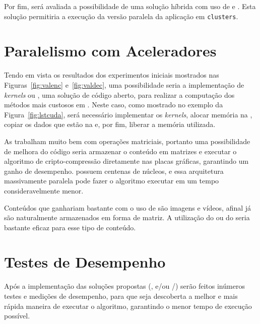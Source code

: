 Por fim, será avaliada a possibilidade de uma solução híbrida com uso de \openMP e \mpi. Esta solução permitiria a execução da versão paralela da aplicação em \texttt{clusters}.

\section{Paralelismo com Aceleradores}

Tendo em  vista os resultados dos experimentos iniciais mostrados nas Figuras~\ref{fig:valenc} e~\ref{fig:valdec}, uma possibilidade seria a implementação de \textit{kernels} \cuda ou \opencl, uma solução de código aberto, para realizar a computação dos métodos mais custosos em \gpu. Neste caso, como mostrado no exemplo da Figura~\ref{fig:lstcuda}, será necessário implementar os \textit{kernels}, alocar memória na \gpu, copiar os dados que estão na \cpu e, por fim, liberar a memória utilizada.

As \gpus trabalham muito bem com operações matriciais, portanto uma possibilidade de melhora do código seria armazenar o conteúdo em matrizes e executar o algoritmo de cripto-compressão diretamente nas placas gráficas, garantindo um ganho de desempenho. \gpus possuem centenas de núcleos, e essa arquitetura massivamente paralela pode fazer o algoritmo \gmpr executar em um tempo consideravelmente menor.

Conteúdos que ganhariam bastante com o uso de \gpus são imagens e vídeos, afinal já são naturalmente armazenados em forma de matriz. A utilização do \cuda ou do \opencl seria bastante eficaz para esse tipo de conteúdo.

\section{Testes de Desempenho}

Após a implementação das soluções propostas (\openMP, \mpi e/ou \cuda/\opencl) serão feitos inúmeros testes e medições de desempenho, para que seja descoberta a melhor e mais rápida maneira de executar o algoritmo, garantindo o menor tempo de execução possível.
